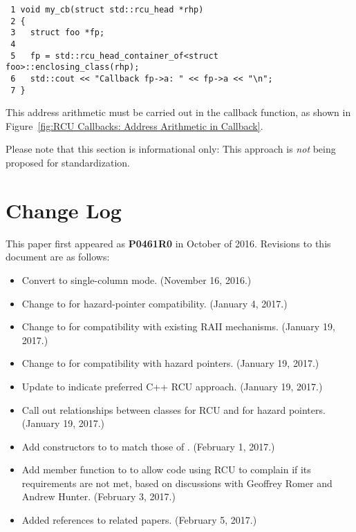 \documentclass[letterpaper,10pt]{article}
\begin{document}
\begin{figure*}[tbp]
{ \scriptsize
\begin{verbatim}
 1 void my_cb(struct std::rcu_head *rhp)
 2 {
 3   struct foo *fp;
 4
 5   fp = std::rcu_head_container_of<struct foo>::enclosing_class(rhp);
 6   std::cout << "Callback fp->a: " << fp->a << "\n";
 7 }
\end{verbatim}
}
\caption{RCU Callbacks: Address Arithmetic in Callback (Informational Only)}
\label{fig:RCU Callbacks: Address Arithmetic in Callback}
\end{figure*}

This address arithmetic must be carried out in the callback function,
as shown in
Figure~\ref{fig:RCU Callbacks: Address Arithmetic in Callback}.

Please note that this section is informational only: This approach
is \emph{not} being proposed for standardization.

%




\section*{Change Log}
\label{sec:Change Log}

This paper first appeared as {\bf P0461R0} in October of 2016.
Revisions to this document are as follows:

\begin{itemize}
\item	Convert to single-column mode.
	(November 16, 2016.)
\item	Change  to  for hazard-pointer compatibility.
	(January 4, 2017.)
\item	Change  to  for compatibility
	with existing RAII mechanisms.
	(January 19, 2017.)
\item	Change  to  for compatibility
	with hazard pointers.
	(January 19, 2017.)
\item	Update to indicate preferred C++ RCU approach.
	(January 19, 2017.)
\item	Call out relationships between classes for RCU and for hazard
	pointers.
	(January 19, 2017.)
\item	Add constructors to  to match those of
	.
	(February 1, 2017.)
\item	Add  member function to
	 to allow code using RCU to complain if
	its requirements are not met, based on discussions with
	Geoffrey Romer and Andrew Hunter.
	(February 3, 2017.)
\item	Added references to related papers.
	(February 5, 2017.)
\end{itemize}
\end{document}
